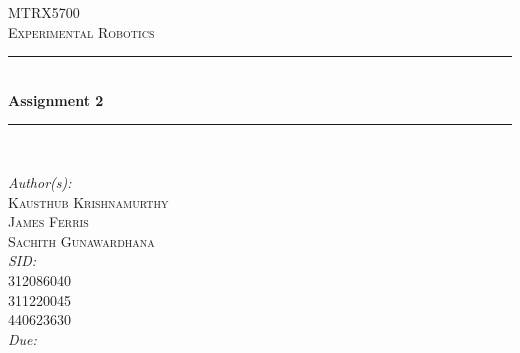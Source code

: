 \begin{titlepage}
	\newcommand{\HRule}{\rule{\linewidth}{0.5mm}}
	\center
	\textsc{\LARGE MTRX5700 \\[0.5cm]Experimental Robotics}\\[1cm] 
	\HRule \\[0.4cm]
	{ \huge \bfseries Assignment 2}\\[0.4cm] 
	\HRule \\[1.5cm]
	\begin{minipage}{1\textwidth}
		\large
		\flushleft
		\emph{Author(s):}\hspace{0.2cm}\textsc{\\Kausthub Krishnamurthy\\James Ferris\\Sachith Gunawardhana}\\ [0.25cm]
		\emph{SID:}\hspace{0.7cm}	\\312086040\\311220045\\440623630\\[0.5cm]
		\emph{Due:}
		\hspace{0.55cm}{April 23, 2015}\hspace{1cm}\\[3cm]	%
	\end{minipage}
	\vfill
\end{titlepage}